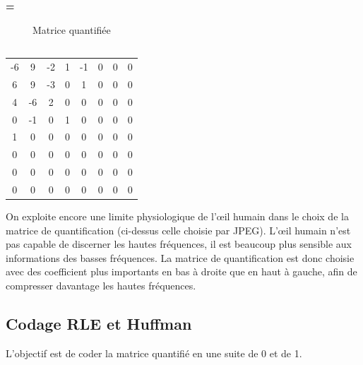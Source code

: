 \documentclass{article}
\begin{document}
\hfill
\begin{minipage}{0.03\textwidth}
    \centering
    \LARGE
    \vspace{-25pt}
    \textbf{=}
\end{minipage}
\hfill
\begin{minipage}{0.23\textwidth}
    \centering
    \begin{table}[H]
        \centering
        \setlength{\tabcolsep}{3pt} %
        \renewcommand{\arraystretch}{1.2} %
        \begin{tabular}{cccccccc}
            -6 & 9 & -2 & 1 & -1 & 0 & 0 & 0 \\
            6 & 9 & -3 & 0 & 1 & 0 & 0 & 0 \\
            4 & -6 & 2 & 0 & 0 & 0 & 0 & 0 \\
            0 & -1 & 0 & 1 & 0 & 0 & 0 & 0 \\
            1 & 0 & 0 & 0 & 0 & 0 & 0 & 0 \\
            0 & 0 & 0 & 0 & 0 & 0 & 0 & 0 \\
            0 & 0 & 0 & 0 & 0 & 0 & 0 & 0 \\
            0 & 0 & 0 & 0 & 0 & 0 & 0 & 0 \\
        \end{tabular}
        \caption*{\centering Matrice quantifiée \\ \ }
    \end{table}
\end{minipage}

\vspace{.7cm}

On exploite encore une limite physiologique de l’œil humain dans le choix de la matrice de quantification (ci-dessus celle choisie par JPEG). L’œil humain n'est pas capable de discerner les hautes fréquences, il est beaucoup plus sensible aux informations des basses fréquences. La matrice de quantification est donc choisie avec des coefficient plus importants en bas à droite que en haut à gauche, afin de compresser davantage les hautes fréquences.

\subsection{Codage RLE et Huffman}

L'objectif est de coder la matrice quantifié en une suite de 0 et de 1.

\vspace{.3cm}
\end{document}
